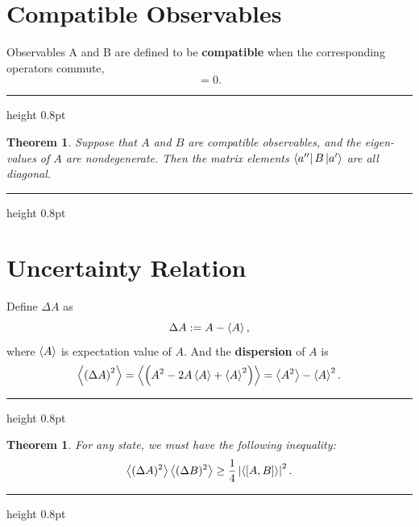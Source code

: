 \documentclass{article}
\newcommand{\singleline}{\hrule height 0.8pt}
\theoremstyle{1}
\newtheorem{theorem}[problem]{Theorem}
\begin{document}
\section{Compatible Observables}
Observables A and B are defined to be \textbf{compatible} when
the corresponding operators commute,
\begin{equation}
    [A,B]=0.
\end{equation}
\singleline
\begin{theorem}
    Suppose that $A$ and $B$ are compatible observables, and the eigen-values of $A$ are nondegenerate. Then the matrix elements 
 $\bra{a''}B\ket{a'}$ are all diagonal. 
\end{theorem}
\singleline

\section{Uncertainty Relation}
Define $\Delta A$ as 
\begin{equation}
    \Delta A:= A -\expval{A},
\end{equation}
where $\expval{A}$ is expectation value of $A$. And the \textbf{dispersion} of $A$ is
\begin{equation}
   \expval{ \left(\Delta A\right)^2}=\expval{\left(A^2-2A\expval{A}+\expval{A}^2\right)}=\expval{A^2}-\expval{A}^2.
\end{equation}
\singleline
\begin{theorem}
    For any state, we must have the following inequality:
    \begin{equation}\label{7.3}
        \expval{(\Delta A)^2}\expval{(\Delta B)^2}\ge\frac{1}{4}\left|\expval{[A,B]}\right|^2.
    \end{equation}
\end{theorem}
\singleline
\end{document}
